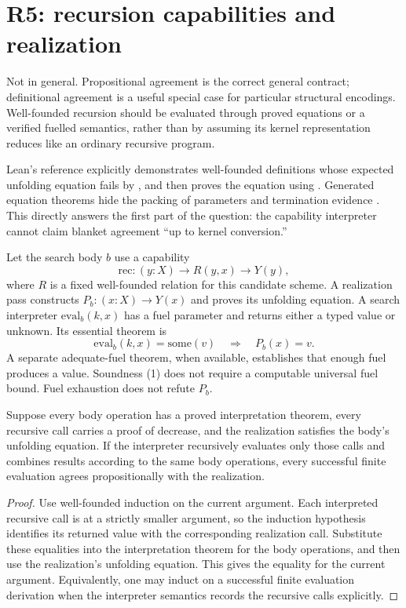 \section{R5: recursion capabilities and realization}
\label{sec:recursion}

\ans Not in general. Propositional agreement is the correct general contract; definitional agreement is a useful special case for particular structural encodings. Well-founded recursion should be evaluated through proved equations or a verified fuelled semantics, rather than by assuming its kernel representation reduces like an ordinary recursive program.

Lean's reference explicitly demonstrates well-founded definitions whose expected unfolding equation fails by , and then proves the equation using . Generated equation theorems hide the packing of parameters and termination evidence \cite{leanrecursion}. This directly answers the first part of the question: the capability interpreter cannot claim blanket agreement ``up to kernel conversion.''

Let the search body $b$ use a capability
\[
 \mathrm{rec}:(y:X)\to R(y,x)\to Y(y),
\]
where $R$ is a fixed well-founded relation for this candidate scheme. A realization pass constructs $P_b:(x:X)\to Y(x)$ and proves its unfolding equation. A search interpreter $\mathrm{eval}_b(k,x)$ has a fuel parameter and returns either a typed value or unknown. Its essential theorem is
\[
  \mathrm{eval}_b(k,x)=\mathrm{some}(v)
  \quad\Longrightarrow\quad P_b(x)=v. \tag{1}
\]
A separate adequate-fuel theorem, when available, establishes that enough fuel produces a value. Soundness (1) does not require a computable universal fuel bound. Fuel exhaustion does not refute $P_b$.

\begin{proposition}
Suppose every body operation has a proved interpretation theorem, every recursive call carries a proof of decrease, and the realization satisfies the body's unfolding equation. If the interpreter recursively evaluates only those calls and combines results according to the same body operations, every successful finite evaluation agrees propositionally with the realization.
\end{proposition}
\begin{proof}
Use well-founded induction on the current argument. Each interpreted recursive call is at a strictly smaller argument, so the induction hypothesis identifies its returned value with the corresponding realization call. Substitute these equalities into the interpretation theorem for the body operations, and then use the realization's unfolding equation. This gives the equality for the current argument. Equivalently, one may induct on a successful finite evaluation derivation when the interpreter semantics records the recursive calls explicitly.
\end{proof}

